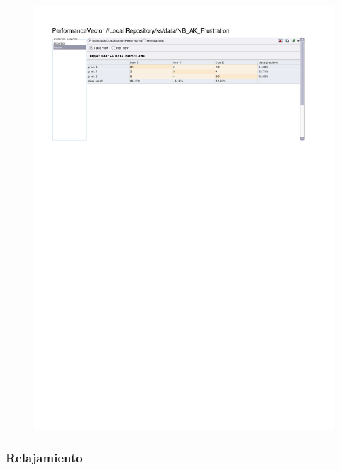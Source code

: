 \begin{figure}[htp]
  \centerline{\includegraphics[trim=0 680 0 60,clip,width=16.09cm]{results/NB_K_Frustration.pdf}} \caption{
} \label{NB_K_Frustration}
\end{figure}

\clearpage
\FloatBarrier
\subsubsection{Relajamiento}

